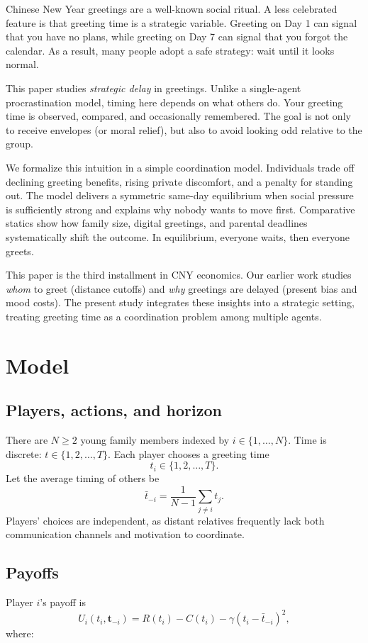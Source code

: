 \documentclass[AER]{AEA}
\begin{document}
Chinese New Year greetings are a well-known social ritual. A less celebrated feature is that greeting time is a strategic variable. Greeting on Day 1 can signal that you have no plans, while greeting on Day 7 can signal that you forgot the calendar. As a result, many people adopt a safe strategy: wait until it looks normal.

This paper studies \emph{strategic delay} in greetings. Unlike a single-agent procrastination model, timing here depends on what others do. Your greeting time is observed, compared, and occasionally remembered. The goal is not only to receive envelopes (or moral relief), but also to avoid looking odd relative to the group.

We formalize this intuition in a simple coordination model. Individuals trade off declining greeting benefits, rising private discomfort, and a penalty for standing out. The model delivers a symmetric same-day equilibrium when social pressure is sufficiently strong and explains why nobody wants to move first. Comparative statics show how family size, digital greetings, and parental deadlines systematically shift the outcome. In equilibrium, everyone waits, then everyone greets.

This paper is the third installment in CNY economics. Our earlier work studies \emph{whom} to greet (distance cutoffs) and \emph{why} greetings are delayed (present bias and mood costs). The present study integrates these insights into a strategic setting, treating greeting time as a coordination problem among multiple agents.

\section{Model}

\subsection{Players, actions, and horizon}
There are $N\ge2$ young family members indexed by $i\in\{1,\dots,N\}$. Time is discrete:
$t\in\{1,2,\dots,T\}$. Each player chooses a greeting time
\[
t_i\in\{1,2,\dots,T\}.
\]
Let the average timing of others be
\[
\bar t_{-i}=\frac{1}{N-1}\sum_{j\ne i} t_j .
\]
Players' choices are independent, as distant relatives frequently lack both communication channels and motivation to coordinate.

\subsection{Payoffs}
Player $i$'s payoff is
\begin{equation}
U_i(t_i,\mathbf t_{-i})=R(t_i)-C(t_i)-\gamma (t_i-\bar t_{-i})^2 ,
\label{eq:payoff}
\end{equation}
where:
\end{document}
